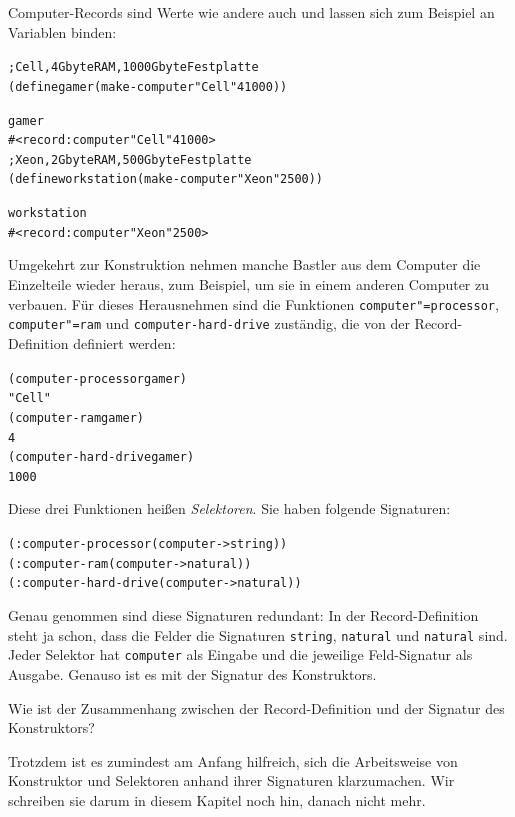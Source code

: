 Computer-Records sind Werte wie andere auch und lassen sich zum Beispiel an
Variablen binden:
%
\begin{alltt}
; Cell, 4 Gbyte RAM, 1000 Gbyte Festplatte
(define gamer (make-computer "Cell" 4 1000))

gamer
\evalsto{} #<record:computer "Cell" 4 1000>
; Xeon, 2 Gbyte RAM, 500 Gbyte Festplatte
(define workstation (make-computer "Xeon" 2 500))

workstation
\evalsto{} #<record:computer "Xeon" 2 500>
\end{alltt}
%
Umgekehrt zur Konstruktion nehmen manche Bastler aus dem Computer die
Einzelteile wieder heraus, zum Beispiel, um sie in einem anderen
Computer zu verbauen. Für dieses Herausnehmen sind die Funktionen
\texttt{computer"=processor}, \texttt{computer"=ram} und
\texttt{computer-hard-drive} zuständig, die von der
Record-Definition definiert werden:
%
\begin{alltt}
(computer-processor gamer)
\evalsto{} "Cell"
(computer-ram gamer)
\evalsto{} 4
(computer-hard-drive gamer)
\evalsto{} 1000
\end{alltt}
%
Diese drei Funktionen heißen \textit{Selektoren}.  Sie haben
folgende Signaturen:
%
\begin{alltt}
(: computer-processor (computer -> string))
(: computer-ram (computer -> natural))
(: computer-hard-drive (computer -> natural))
\end{alltt}
%
Genau genommen sind diese Signaturen redundant: In der
Record-Definition steht ja schon, dass die Felder die Signaturen
\texttt{string}, \texttt{natural} und \texttt{natural} sind.  Jeder
Selektor hat \texttt{computer} als Eingabe und die jeweilige
Feld-Signatur als Ausgabe.  Genauso ist es mit der Signatur des
Konstruktors.
%
\begin{aufgabe}
  Wie ist der Zusammenhang zwischen der Record-Definition und der
  Signatur des Konstruktors?
\end{aufgabe}
%
Trotzdem ist es zumindest am Anfang hilfreich, sich die Arbeitsweise
von Konstruktor und Selektoren anhand ihrer Signaturen klarzumachen.
Wir schreiben sie darum in diesem Kapitel noch hin, danach nicht mehr.

